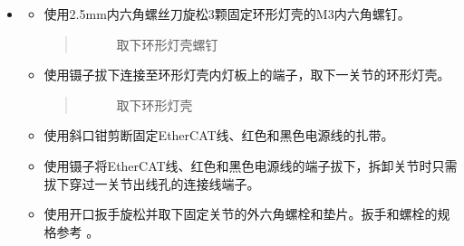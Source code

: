 \documentclass[a4paper,11pt,english,openany,oneside]{sphinxmanual}
\begin{document}
\begin{itemize}
\begin{itemize}
\begin{quote}
\begin{figure}[H]
\noindent{}
\caption{分离大臂}\label{\detokenize{_u66f4_u6362_u5173_u8282:id35}}\end{figure}
\end{quote}

\end{itemize}

\item {} 
\sphinxAtStartPar
{}
\begin{itemize}
\item {} 
\sphinxAtStartPar
使用2.5mm内六角螺丝刀旋松3颗固定环形灯壳的M3内六角螺钉。
\begin{quote}

\begin{figure}[H]
\centering
\capstart

\noindent{}
\caption{取下环形灯壳螺钉}\label{\detokenize{_u66f4_u6362_u5173_u8282:id36}}\end{figure}
\end{quote}

\item {} 
\sphinxAtStartPar
使用镊子拔下连接至环形灯壳内灯板上的端子，取下一关节的环形灯壳。
\begin{quote}

\begin{figure}[H]
\centering
\capstart

\noindent{}
\caption{取下环形灯壳}\label{\detokenize{_u66f4_u6362_u5173_u8282:id37}}\end{figure}
\end{quote}

\item {} 
\sphinxAtStartPar
使用斜口钳剪断固定EtherCAT线、红色和黑色电源线的扎带。

\item {} 
\sphinxAtStartPar
使用镊子将EtherCAT线、红色和黑色电源线的端子拔下，拆卸关节时只需拔下穿过一关节出线孔的连接线端子。

\item {} 
\sphinxAtStartPar
使用开口扳手旋松并取下固定关节的外六角螺栓和垫片。扳手和螺栓的规格参考 {\hyperref[\detokenize{_u66f4_u6362_u5173_u8282:id9}]{}} 。
\begin{quote}

\begin{figure}[H]
\centering
\capstart


\end{figure}
\end{quote}
\end{itemize}
\end{itemize}
\end{document}
